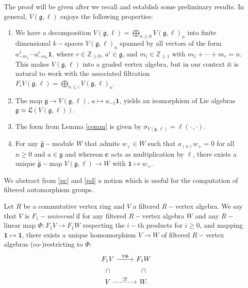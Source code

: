 \documentclass{article}
\theoremstyle{definition}
\begin{document}
The proof will be given after we recall and establish some preliminary results.   In general, $V(\mathfrak g, \ell)$ enjoys the following properties:
    \begin{enumerate}[label = \textup{\alph*)}]
        \item We have a decomposition $V(\mathfrak g, \ell) = \bigoplus_{n \geq 0} V(\mathfrak g, \ell)_n$ into finite dimensional $k-$spaces $V(\mathfrak g, \ell)_n$ spanned by all vectors of the form 
        $a^1_{-m_1} \cdots a^r_{-m_r} \mathbf 1$, where $r\in \mathbb Z_{\geq 0}$, $a^i \in \mathfrak g$, and $m_i \in \mathbb Z_{\geq 1}$  with  $m_1 + \cdots + m_r = n$. 
        This makes $V(\mathfrak g, \ell)$ into a graded vertex algebra, but in our context it is natural to work with the associated filtration $F_i V(\mathfrak g, \ell) = \bigoplus_{n \leq i} V(\mathfrak g, \ell)_n$.
\item The map $\mathfrak g \to V(\mathfrak g, \ell)$, $a \mapsto a_{-1} \mathbf 1$, yields an isomorphism of Lie algebras $\mathfrak g \simeq \mathfrak L(V(\mathfrak g,\ell))$.
	\item \label{pc} The form from Lemma \ref{comm} is given by $\sigma_{V(\mathfrak g, \ell)} = \ell(\cdot \,, \cdot)$.
	\item \label{pd} For any $\widehat {\mathfrak g}-$module $W $ that admits $w_+ \in W$ such that $a_{(n)} w_+ = 0$ for all $n \geq 0$ and $a \in {\mathfrak g}$ and whereon $\mathbf c$ acts as multiplication by $\ell$, there exists a unique $\widehat {\mathfrak g}-$map $V (\mathfrak g, \ell) \to W$ with $\mathbf 1 \mapsto w_+$.
    \end{enumerate}
    
We abstract from \ref{pc} and \ref{pd} a notion which is useful for the computation of filtered automorphism groups.

    Let $R$ be a commutative vertex ring and $V$ a filtered $R-$vertex algebra.
    We say that $V$ is \textit{$F_1-$universal} if for any filtered $R-$vertex algebra $W$ and any $R-$linear map $\Phi \colon F_1 V \to F_1 W$ respecting the $i-$th products for $i \geq 0$, and mapping $\mathbf 1 \mapsto \mathbf 1$, there exists a unique homomorphism $V \to W$ of filtered $R-$vertex algebras (co-)restricting to $\Phi$:
    \[ \begin{tikzcd} F_1 V \ar[r, "\forall \Phi"] \ar[d, phantom, "\subset", sloped] & F_1 W\ar[d, phantom, "\subset", sloped]  \\ V \ar[r, dashed, "\exists !"] & W. \end{tikzcd} \]
\end{document}
